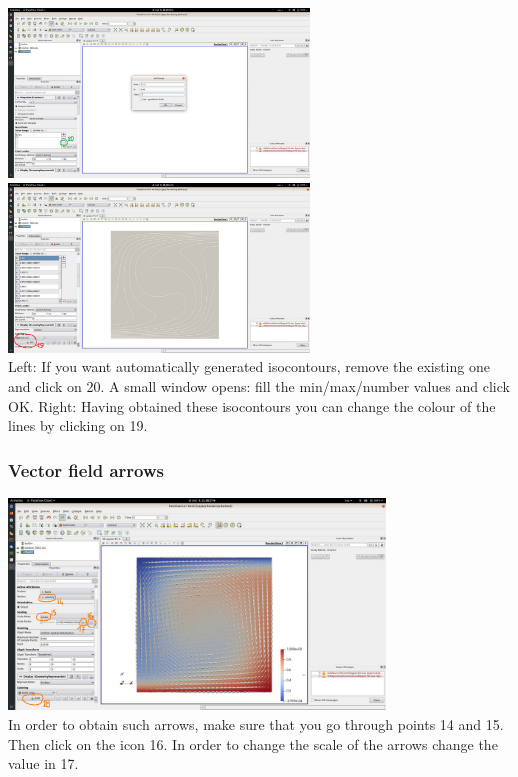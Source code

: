 \begin{center}
\includegraphics[width=8cm]{images/paraview/p8}
\includegraphics[width=8cm]{images/paraview/p9}\\
{\captionfont Left: If you want automatically generated isocontours, 
remove the existing one and click on 20. A small window opens: 
fill the min/max/number values and click OK.
Right: Having obtained these isocontours you can change the colour of the lines 
by clicking on 19.}
\end{center}

\subsubsection*{Vector field arrows}

\begin{center}
\includegraphics[width=10cm]{images/paraview/p10}\\
{\captionfont In order to obtain such arrows, make sure that you go through points 14 and 15.\\ 
Then click on the icon 16. In order to change the scale of the arrows change the value in 17.}
\end{center}


